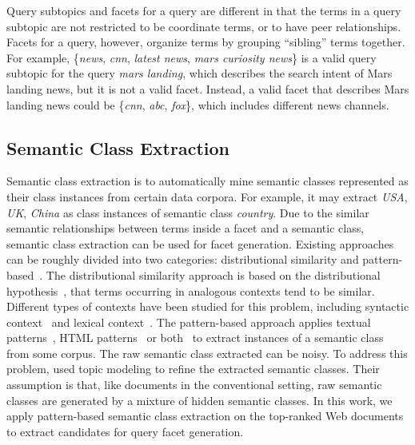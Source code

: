 Query subtopics and facets for a query are different in that the terms in a query subtopic are not restricted to be coordinate terms, or to have peer relationships. Facets for a query, however, organize terms by grouping ``sibling'' terms together. For example, \{\textit{news}, \textit{cnn}, \textit{latest news}, \textit{mars curiosity news}\} is a valid query subtopic for the query \textit{mars landing}, which describes the search intent of Mars landing news, but it is not a valid facet. Instead, a valid facet that describes Mars landing news could be \{\textit{cnn}, \textit{abc}, \textit{fox}\}, which includes different news channels.

\subsection{Semantic Class Extraction}
Semantic class extraction is to automatically mine semantic classes represented as their class instances from certain data corpora. For example, it may extract \textit{USA}, \textit{UK}, \textit{China} as class instances of semantic class \textit{country}. Due to the similar semantic relationships between terms inside a facet and a semantic class, semantic class extraction can be used for facet generation. Existing approaches can be roughly divided into two categories: distributional similarity and pattern-based~\cite{shi2010corpus}. The distributional similarity approach is based on the distributional hypothesis~\cite{Harris}, that terms occurring in analogous contexts tend to be similar. Different types of contexts have been studied for this problem, including syntactic context~\cite{pantel2002discovering} and lexical context~\cite{pantel2004towards,agirre2009study,pantel2009web}.
The pattern-based approach applies textual patterns~\cite{hearst1992automatic,pasca2004acquisition}, HTML patterns~\cite{shinzato2007simple} or both~\cite{zhang2009employing,shi2010corpus} to extract instances of a semantic class from some corpus.
The raw semantic class extracted can be noisy. To address this problem, \citet{zhang2009employing} used topic modeling to refine the extracted semantic classes.
Their assumption is that, like documents in the conventional setting, raw semantic classes are generated by a mixture of hidden semantic classes.
In this work, we apply pattern-based semantic class extraction on the top-ranked Web documents to extract candidates for query facet generation.

